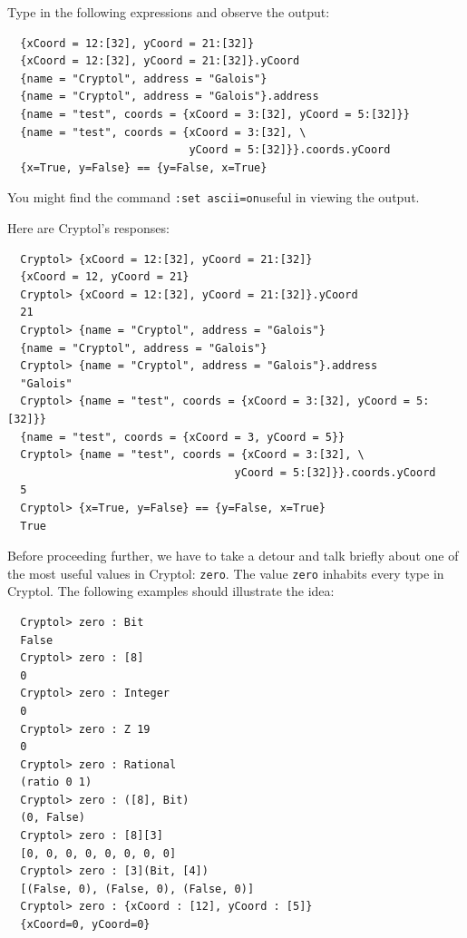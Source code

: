 \begin{Exercise}\label{ex:record:1}
Type in the following expressions and observe the output:
\begin{Verbatim}
  {xCoord = 12:[32], yCoord = 21:[32]}
  {xCoord = 12:[32], yCoord = 21:[32]}.yCoord
  {name = "Cryptol", address = "Galois"}
  {name = "Cryptol", address = "Galois"}.address
  {name = "test", coords = {xCoord = 3:[32], yCoord = 5:[32]}}
  {name = "test", coords = {xCoord = 3:[32], \
                            yCoord = 5:[32]}}.coords.yCoord
  {x=True, y=False} == {y=False, x=True}
\end{Verbatim}
\noindent You might find the command {\tt :set
  ascii=on}\indSettingASCII useful in viewing the output.
\end{Exercise}
\begin{Answer}
Here are Cryptol's responses:
\begin{small}
\begin{Verbatim}
  Cryptol> {xCoord = 12:[32], yCoord = 21:[32]}
  {xCoord = 12, yCoord = 21}
  Cryptol> {xCoord = 12:[32], yCoord = 21:[32]}.yCoord
  21
  Cryptol> {name = "Cryptol", address = "Galois"}
  {name = "Cryptol", address = "Galois"}
  Cryptol> {name = "Cryptol", address = "Galois"}.address
  "Galois"
  Cryptol> {name = "test", coords = {xCoord = 3:[32], yCoord = 5:[32]}}
  {name = "test", coords = {xCoord = 3, yCoord = 5}}
  Cryptol> {name = "test", coords = {xCoord = 3:[32], \
                                   yCoord = 5:[32]}}.coords.yCoord
  5
  Cryptol> {x=True, y=False} == {y=False, x=True}
  True
\end{Verbatim}
\end{small}
\end{Answer}


Before proceeding further, we have to take a detour and talk briefly
about one of the most useful values in Cryptol: {\tt zero}.\indZero
The value {\tt zero} inhabits every type in Cryptol.
The following examples should illustrate the idea:
\begin{Verbatim}
  Cryptol> zero : Bit
  False
  Cryptol> zero : [8]
  0
  Cryptol> zero : Integer
  0
  Cryptol> zero : Z 19
  0
  Cryptol> zero : Rational
  (ratio 0 1)
  Cryptol> zero : ([8], Bit)
  (0, False)
  Cryptol> zero : [8][3]
  [0, 0, 0, 0, 0, 0, 0, 0]
  Cryptol> zero : [3](Bit, [4])
  [(False, 0), (False, 0), (False, 0)]
  Cryptol> zero : {xCoord : [12], yCoord : [5]}
  {xCoord=0, yCoord=0}
\end{Verbatim}

